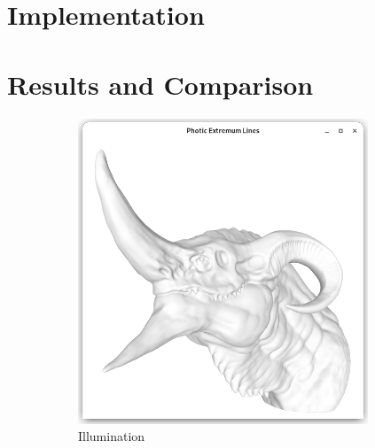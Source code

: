\documentclass[9pt,fleqn,twoside,twocolumn]{stdglobal}
\begin{document}
\section{Implementation}

\section{Results and Comparison}

  \begin{figure}
      \centering
      \begin{subfigure}[b]{0.24\textwidth}
        \centering
        \includegraphics[width=0.95\textwidth,trim={15px 15 15 50},clip]{images/dragon-head-viewer-shader.png}
        \caption{Illumination}
      \end{subfigure}%
      \hfill%
      \begin{subfigure}[b]{0.24\textwidth}
        \centering

\end{subfigure}
\end{figure}
\end{document}
